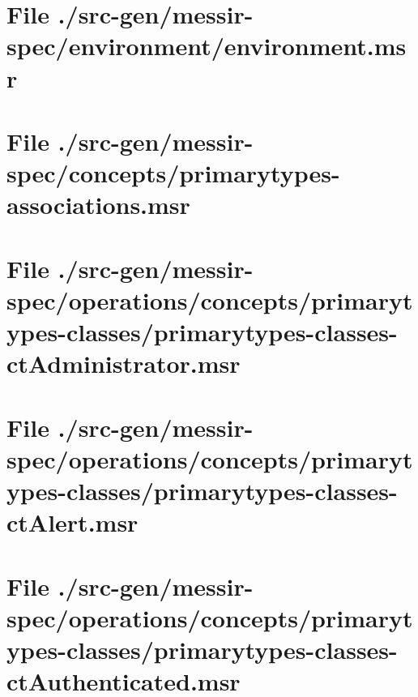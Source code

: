 \section[File /src-gen/messir-spec/environment/environment.msr]{File ./src-gen/messir-spec/environment/environment.msr}
\scriptsize

\normalsize
	
\section[File /src-gen/messir-spec/concepts/primarytypes-associations.msr]{File ./src-gen/messir-spec/concepts/primarytypes-associations.msr}
\scriptsize

\normalsize
	
\section[File /src-gen/messir-spec.../primarytypes-classes-ctAdministrator.msr]{File ./src-gen/messir-spec/operations/concepts/primarytypes-classes/primarytypes-classes-ctAdministrator.msr}
\scriptsize

\normalsize
	
\section[File /src-gen/messir-spec/operations.../primarytypes-classes-ctAlert.msr]{File ./src-gen/messir-spec/operations/concepts/primarytypes-classes/primarytypes-classes-ctAlert.msr}
\scriptsize

\normalsize
	
\section[File /src-gen/messir-spec.../primarytypes-classes-ctAuthenticated.msr]{File ./src-gen/messir-spec/operations/concepts/primarytypes-classes/primarytypes-classes-ctAuthenticated.msr}
\scriptsize

\normalsize
	
